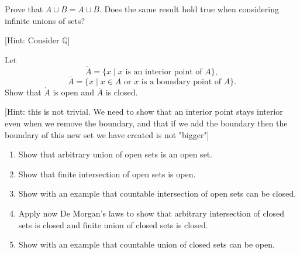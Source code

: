 \documentclass[11pt]{article}%
\newcommand{\Q}{\mathbb{Q}}
\begin{document}
\begin{Exercise}[title=**]
	Prove that $\overline{A\cup B} = \overline A \cup \overline B$. Does the same result hold true when considering infinite unions of sets?
	
	
	[Hint: Consider $\Q$]
	
\end{Exercise}

\begin{Exercise}[title=**]
	Let
	\[\mathring{A}=\{x\;|\;x \text{ is an interior point of } A\},\]
	\[\bar{A}=\{x\;|\;x\in A \text{ or } x \text{ is a boundary point of } A\}.\]
	Show that $\mathring{A}$ is open and $\bar{A}$ is closed.
	
	[Hint: this is not trivial. We need to show that an interior point stays interior even when we remove the boundary, and that if we add the boundary then the boundary of this new set we have created is not "bigger"]
\end{Exercise}

\begin{Exercise}[title=*]
	\begin{enumerate}[label={\alph*)}]
	\item Show that arbitrary union of open sets is an open set.
	\item Show that finite intersection of open sets is open.
	\item Show with an example that countable intersection of open sets can be closed.
	\item Apply now De Morgan's laws to show that  arbitrary intersection of closed sets is closed and finite union of closed sets is closed.
	\item Show with an example that countable union of closed sets can be open.
	\end{enumerate}
\end{Exercise}
\end{document}
